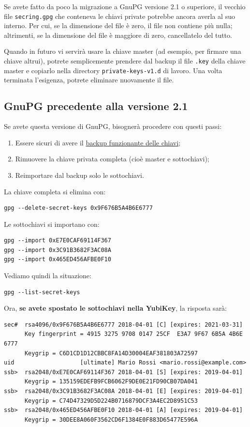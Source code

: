 \documentclass[a4paper,10pt]{article}
\begin{document}
Se avete fatto da poco la migrazione a GnuPG versione 2.1 o superiore, il vecchio file \texttt{secring.gpg} che conteneva le chiavi private potrebbe ancora averla al suo interno. Per cui, se la dimensione del file è zero, il file non contiene più nulla; altrimenti, se la dimensione del file è maggiore di zero, cancellatelo del tutto.

Quando in futuro vi servirà usare la chiave master (ad esempio, per firmare una chiave altrui), potrete semplicemente prendere dal backup il file \texttt{.key} della chiave master e copiarlo nella directory \texttt{private-keys-v1.d} di lavoro. Una volta terminata l'esigenza, potrete eliminare nuovamente il file.

\subsection{GnuPG precedente alla versione 2.1}

Se avete questa versione di GnuPG, bisognerà procedere con questi passi:

\begin{enumerate}
   \item Essere sicuri di avere il \hyperref[backup-chiavi]{backup funzionante delle chiavi};
   \item Rimuovere la chiave privata completa (cioè master e sottochiavi);
   \item Reimportare dal backup solo le sottochiavi.
\end{enumerate}

La chiave completa si elimina con:

\begin{lstlisting}
gpg --delete-secret-keys 0x9F676B5A4B6E6777
\end{lstlisting}

Le sottochiavi si importano con:

\begin{lstlisting}
gpg --import 0xE7E0CAF69114F367
gpg --import 0x3C91B3682F3AC08A
gpg --import 0x465ED456AFBE0F10
\end{lstlisting}

Vediamo quindi la situazione:

\begin{lstlisting}
gpg --list-secret-keys
\end{lstlisting}

Ora, \textbf{se avete spostato le sottochiavi nella YubiKey}, la risposta sarà:

\begin{lstlisting}
sec#  rsa4096/0x9F676B5A4B6E6777 2018-04-01 [C] [expires: 2021-03-31]
      Key fingerprint = 4915 3275 9708 0147 25CF  E3A7 9F67 6B5A 4B6E 6777
      Keygrip = C6D1CD1D12CBBC8FA14D30004EAF381803A72597
uid                   [ultimate] Mario Rossi <mario.rossi@example.com>
ssb>  rsa2048/0xE7E0CAF69114F367 2018-04-01 [S] [expires: 2019-04-01]
      Keygrip = 135159EDEFB9FCB6062F9DE0E21FD90CB07DA041
ssb>  rsa2048/0x3C91B3682F3AC08A 2018-04-01 [E] [expires: 2019-04-01]
      Keygrip = C74D47329D5D224B0716879DCF3A4EC2D8951C53
ssb>  rsa2048/0x465ED456AFBE0F10 2018-04-01 [A] [expires: 2019-04-01]
      Keygrip = 30DEE8A060F3562CD6F1384E0F883D65477E596A
\end{lstlisting}
\end{document}
